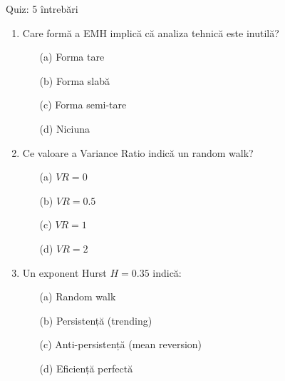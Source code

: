 \documentclass[9pt, aspectratio=169, t]{beamer}
\begin{document}
\begin{frame}{Quiz: 5 întrebări}
    \begin{cminipage}{0.95\textwidth}
\begin{enumerate}\setlength{\itemsep}{0pt}
    \item Care formă a EMH implică că analiza tehnică este inutilă?
    \begin{enumerate}\setlength{\itemsep}{0pt}
        \item[(a)] Forma tare
        \item[(b)] Forma slabă
        \item[(c)] Forma semi-tare
        \item[(d)] Niciuna
    \end{enumerate}

    \vspace{0.2cm}
    \item Ce valoare a Variance Ratio indică un random walk?
    \begin{enumerate}\setlength{\itemsep}{0pt}
        \item[(a)] $VR = 0$
        \item[(b)] $VR = 0.5$
        \item[(c)] $VR = 1$
        \item[(d)] $VR = 2$
    \end{enumerate}

    \vspace{0.2cm}
    \item Un exponent Hurst $H = 0.35$ indică:
    \begin{enumerate}\setlength{\itemsep}{0pt}
        \item[(a)] Random walk
        \item[(b)] Persistență (trending)
        \item[(c)] Anti-persistență (mean reversion)
        \item[(d)] Eficiență perfectă
    \end{enumerate}
\end{enumerate}
    \end{cminipage}
\end{frame}
\end{document}
